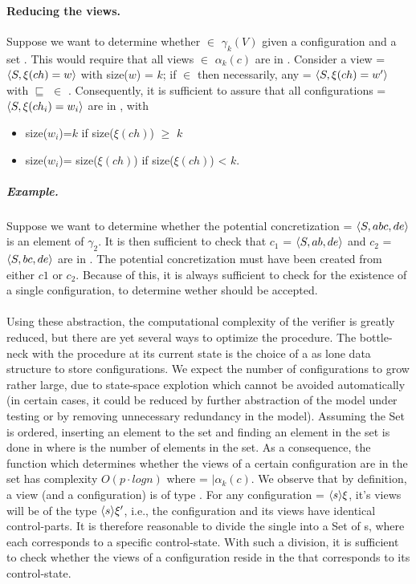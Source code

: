 \paragraph{Reducing the views.}
Suppose we want to determine whether  $\in$ $\gamma_k(V)$ given a configuration  and a set . This would require that all views  $\in$ $\alpha_k(c)$ are in . Consider a view  = $\langle S, \xi(ch)=w\rangle$ with size($w$) = $k$; if  $\in$  then necessarily, any  = $\langle S, \xi(ch)=w'\rangle$ with  $\sqsubseteq$  $\in$ . Consequently, it is sufficient to assure that all configurations  = $\langle S,\xi(ch_i)=w_i\rangle$ are in , with

\begin{itemize}
\item
size($w_i$)=$k$ if size($\xi(ch)$) $\geq$ $k$
\item
size($w_i$)= size($\xi(ch)$) if size($\xi(ch)$) < $k$.
\end{itemize}

\subparagraph{Example.} Suppose we want to determine whether the potential concretization  = $\langle S, abc, de\rangle$ is an element of $\gamma_2$. It is then sufficient to check that $c_1$ = $\langle S,ab,de\rangle$ and $c_2$ = $\langle S,bc ,de\rangle$ are in . The potential concretization must have been created from either $c1$ or $c_2$. Because of this, it is always sufficient to check for the existence of a single configuration, to determine wether  should be accepted.
\\\\

Using these abstraction, the computational complexity of the verifier is greatly reduced, but there are yet several ways to optimize the procedure. The bottle-neck with the procedure at its current state is the choice of a  as lone data structure to store configurations. We expect the number of configurations to grow rather large, due to state-space explotion which cannot be avoided automatically (in certain cases, it could be reduced by further abstraction of the model under testing or by removing unnecessary redundancy in the model). Assuming the Set is ordered, inserting an element to the set and finding an element in the set is done in  where  is the number of elements in the set. As a consequence, the function  which determines whether the views of a certain configuration are in the set has complexity $O(p \cdot log n)$ where  = $|\alpha_k(c)$. We observe that by definition, a view (and a configuration) is of type . For any configuration  = $\langle s\rangle{\xi}$, it's views will be of the type $\langle s\rangle{\xi'}$, i.e., the configuration and its views have identical control-parts. It is therefore reasonable to divide the single  into a Set of s, where each  corresponds to a specific control-state. With such a division, it is sufficient to check whether the views of a configuration reside in the  that corresponds to its control-state.

